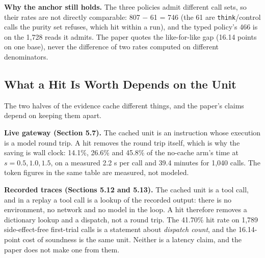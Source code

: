 \documentclass[
  11pt,
]{article}
\begin{document}
\textbf{Why the anchor still holds.} The three policies admit different
call sets, so their rates are not directly comparable: 807 − 61 = 746
(the 61 are \texttt{think}/control calls the purity set refuses, which
hit within a run), and the typed policy's 466 is on the 1,728 reads it
admits. The paper quotes the like-for-like gap (16.14 points on one
base), never the difference of two rates computed on different
denominators.

\subsection{What a Hit Is Worth Depends on the
Unit}\label{what-a-hit-is-worth-depends-on-the-unit}

The two halves of the evidence cache different things, and the paper's
claims depend on keeping them apart.

\textbf{Live gateway (Section 5.7).} The cached unit is an instruction
whose execution is a model round trip. A hit removes the round trip
itself, which is why the saving is wall clock: 14.1\%, 26.6\% and 45.8\%
of the no-cache arm's time at \(s=0.5,1.0,1.5\), on a measured 2.2 s per
call and 39.4 minutes for 1,040 calls. The token figures in the same
table are measured, not modeled.

\textbf{Recorded traces (Sections 5.12 and 5.13).} The cached unit is a
tool call, and in a replay a tool call is a lookup of the recorded
output: there is no environment, no network and no model in the loop. A
hit therefore removes a dictionary lookup and a dispatch, not a round
trip. The 41.70\% hit rate on 1,789 side-effect-free first-trial calls
is a statement about \emph{dispatch count}, and the 16.14-point cost of
soundness is the same unit. Neither is a latency claim, and the paper
does not make one from them.
\end{document}
